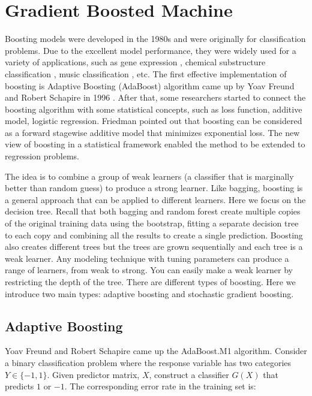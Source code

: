 \documentclass[
  12pt,
]{krantz}
\begin{document}
\hypertarget{gradient-boosted-machine}{%
\section{Gradient Boosted Machine}\label{gradient-boosted-machine}}

Boosting models were developed in the 1980s \citep{Valiant1984, KV1989} and were originally for classification problems. Due to the excellent model performance, they were widely used for a variety of applications, such as gene expression \citep{dudoit2002, bendor2000}, chemical substructure classification \citep{Varmuza2003}, music classification \citep{Bergstra2006}, etc. The first effective implementation of boosting is Adaptive Boosting (AdaBoost) algorithm came up by Yoav Freund and Robert Schapire in 1996 \citep{Schapire1999}. After that, some researchers \citep{Friedman2000} started to connect the boosting algorithm with some statistical concepts, such as loss function, additive model, logistic regression. Friedman pointed out that boosting can be considered as a forward stagewise additive model that minimizes exponential loss. The new view of boosting in a statistical framework enabled the method to be extended to regression problems.

The idea is to combine a group of weak learners (a classifier that is marginally better than random guess) to produce a strong learner. Like bagging, boosting is a general approach that can be applied to different learners. Here we focus on the decision tree. Recall that both bagging and random forest create multiple copies of the original training data using the bootstrap, fitting a separate decision tree to each copy and combining all the results to create a single prediction. Boosting also creates different trees but the trees are grown sequentially and each tree is a weak learner. Any modeling technique with tuning parameters can produce a range of learners, from weak to strong. You can easily make a weak learner by restricting the depth of the tree. There are different types of boosting. Here we introduce two main types: adaptive boosting and stochastic gradient boosting.

\hypertarget{adaptive-boosting}{%
\subsection{Adaptive Boosting}\label{adaptive-boosting}}

Yoav Freund and Robert Schapire \citep{Freund1997} came up the AdaBoost.M1 algorithm. Consider a binary classification problem where the response variable has two categories \(Y \in \{-1, 1\}\). Given predictor matrix, \(X\), construct a classifier \(G(X)\) that predicts \(1\) or \(-1\). The corresponding error rate in the training set is:
\end{document}
